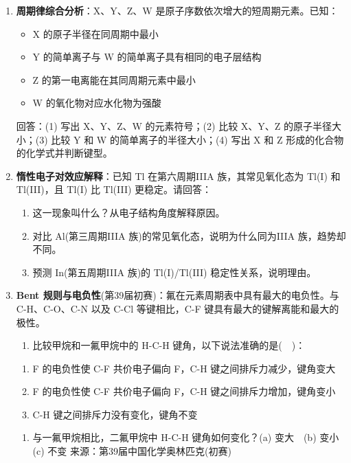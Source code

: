 \begin{enumerate}
  请推断 A、B、C、D 的元素符号，并说明推理过程。
\item
  \textbf{周期律综合分析}：X、Y、Z、W 是原子序数依次增大的短周期元素。已知：

  \begin{itemize}
  \tightlist
  \item
    X 的原子半径在同周期中最小
  \item
    Y 的简单离子与 W 的简单离子具有相同的电子层结构
  \item
    Z 的第一电离能在其同周期元素中最小
  \item
    W 的氧化物对应水化物为强酸
  \end{itemize}

  回答：(1) 写出 X、Y、Z、W 的元素符号；(2) 比较 X、Y、Z 的原子半径大小；(3) 比较 Y 和 W 的简单离子的半径大小；(4) 写出 X 和 Z 形成的化合物的化学式并判断键型。
\item
  \textbf{惰性电子对效应解释}：已知 Tl 在第六周期IIIA 族，其常见氧化态为 Tl(I) 和 Tl(III)，且 Tl(I) 比 Tl(III) 更稳定。请回答：

  \begin{enumerate}
  \def\labelenumii{(\arabic{enumii})}
  \tightlist
  \item
    这一现象叫什么？从电子结构角度解释原因。
  \item
    对比 Al(第三周期IIIA 族)的常见氧化态，说明为什么同为IIIA 族，趋势却不同。
  \item
    预测 In(第五周期IIIA 族)的 Tl(I)/Tl(III) 稳定性关系，说明理由。
  \end{enumerate}
\item
  \textbf{Bent 规则与电负性}(第39届初赛)：氟在元素周期表中具有最大的电负性。与 C-H、C-O、C-N 以及 C-Cl 等键相比，C-F 键具有最大的键解离能和最大的极性。

  \begin{enumerate}
  \def\labelenumii{(\arabic{enumii})}
  \tightlist
  \item
    比较甲烷和一氟甲烷中的 H-C-H 键角，以下说法准确的是(　)：
  \end{enumerate}

  \begin{enumerate}
  \def\labelenumii{(\alph{enumii})}
  \tightlist
  \item
    F 的电负性使 C-F 共价电子偏向 F，C-H 键之间排斥力减少，键角变大
  \item
    F 的电负性使 C-F 共价电子偏向 F，C-H 键之间排斥力增加，键角变小
  \item
    C-H 键之间排斥力没有变化，键角不变
  \end{enumerate}

  \begin{enumerate}
  \def\labelenumii{(\arabic{enumii})}
  \setcounter{enumii}{1}
  \tightlist
  \item
    与一氟甲烷相比，二氟甲烷中 H-C-H 键角如何变化？(a) 变大　(b) 变小　(c) 不变
    来源：第39届中国化学奥林匹克(初赛)
  \end{enumerate}
\end{enumerate}

